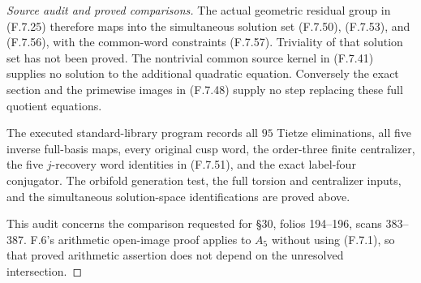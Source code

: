\begin{proof}[Source audit and proved comparisons]
The actual geometric residual group in (F.7.25)
therefore maps into the simultaneous solution
set (F.7.50), (F.7.53), and (F.7.56), with the
common-word constraints (F.7.57).
Triviality of that solution set has not been
proved.  The nontrivial common source kernel
in (F.7.41) supplies no solution to the additional
quadratic equation.  Conversely the exact
section and the primewise images in (F.7.48)
supply no step replacing these full quotient
equations.

The executed standard-library program
records all $95$ Tietze eliminations, all five
inverse full-basis maps, every original cusp
word, the order-three finite centralizer,
the five $j$-recovery word identities in
(F.7.51), and the exact label-four conjugator.
The orbifold generation test, the full torsion
and centralizer inputs, and the simultaneous
solution-space identifications are proved above.


This audit concerns the comparison requested for
\S30, folios 194--196, scans 383--387. F.6's
arithmetic open-image proof applies to $A_5$ without
using (F.7.1), so that proved arithmetic assertion
does not depend on the unresolved intersection.
\end{proof}
